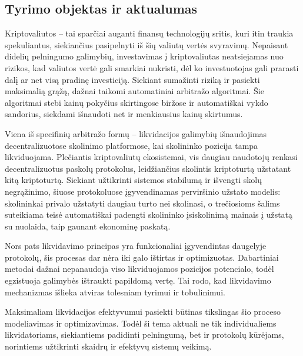 \documentclass[]{VUMIFTemplateClass}
\begin{document}

\subsection*{Tyrimo objektas ir aktualumas}
Kriptovaliutos – tai sparčiai auganti finansų technologijų sritis, kuri itin traukia spekuliantus, siekiančius pasipelnyti iš šių valiutų vertės svyravimų. Nepaisant didelių pelningumo galimybių, investavimas į kriptovaliutas neatsiejamas nuo rizikos, kad valiutos vertė gali smarkiai nukristi, dėl ko investuotojas gali prarasti dalį ar net visą pradinę investiciją. Siekiant sumažinti riziką ir pasiekti maksimalią grąžą, dažnai taikomi automatiniai arbitražo algoritmai. Šie algoritmai stebi kainų pokyčius skirtingose biržose ir automatiškai vykdo sandorius, siekdami išnaudoti net ir menkiausius kainų skirtumus.

Viena iš specifinių arbitražo formų – likvidacijos galimybių išnaudojimas decentralizuotose skolinimo platformose, kai skolininko pozicija tampa likviduojama. Plečiantis kriptovaliutų ekosistemai, vis daugiau naudotojų renkasi decentralizuotus paskolų protokolus, leidžiančius skolintis kriptoturtą užstatant kitą kriptoturtą. Siekiant užtikrinti sistemos stabilumą ir išvengti skolų negrąžinimo, šiuose protokoluose įgyvendinamas perviršinio užstato modelis: skolininkai privalo užstatyti daugiau turto nei skolinasi, o trečiosioms šalims suteikiama teisė automatiškai padengti skolininko įsiskolinimą mainais į užstatą su nuolaida, taip gaunant ekonominę paskatą.

Nors pats likvidavimo principas yra funkcionaliai įgyvendintas daugelyje protokolų, šis procesas dar nėra iki galo ištirtas ir optimizuotas. Dabartiniai metodai dažnai nepanaudoja viso likviduojamos pozicijos potencialo, todėl egzistuoja galimybės ištraukti papildomą vertę. Tai rodo, kad likvidavimo mechanizmas išlieka atviras tolesniam tyrimui ir tobulinimui.

Maksimaliam likvidacijos efektyvumui pasiekti būtinas tikslingas šio proceso modeliavimas ir optimizavimas. Todėl ši tema aktuali ne tik individualiems likvidatoriams, siekiantiems padidinti pelningumą, bet ir protokolų kūrėjams, norintiems užtikrinti skaidrų ir efektyvų sistemų veikimą.
\end{document}
